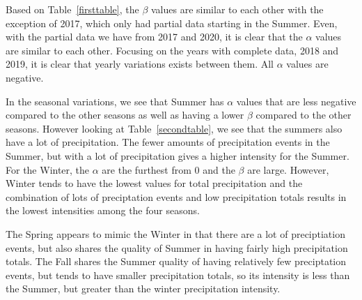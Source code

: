\documentclass[11pt]{report}
\begin{document}


 
Based on Table~\ref{firsttable}, the $\beta$ values are similar to
each other with the exception of 2017, which only had partial data
starting in the Summer. Even, with the partial data we have from 2017
and 2020, it is clear that the $\alpha$ values are similar to each
other. Focusing on the years with complete data, 2018 and 2019, it is
clear that yearly variations exists between them. All $\alpha$ values
are negative.

In the seasonal variations, we see that Summer has $\alpha$ values
that are less negative compared to the other seasons as well as having
a lower $\beta$ compared to the other seasons. However looking at
Table~\ref{secondtable}, we see that the summers also have a lot of
precipitation. The fewer amounts of precipitation events in the
Summer, but with a lot of precipitation gives a higher intensity for
the Summer. For the Winter, the $\alpha$ are the furthest from 0 and
the $\beta$ are large. However, Winter tends to have the lowest values
for total precipitation and the combination of lots of preciptation
events and low precipitation totals results in the lowest intensities
among the four seasons.

The Spring appears to mimic the Winter in that there are a lot of
preciptiation events, but also shares the quality of Summer in having
fairly high precipitation totals. The Fall shares the Summer quality
of having relatively few preciptation events, but tends to have
smaller precipitation totals, so its intensity is less than the
Summer, but greater than the winter precipitation intensity.
\end{document}
